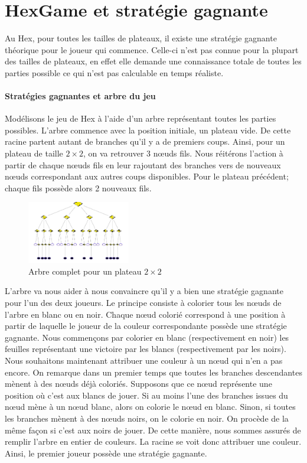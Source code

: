 \section{HexGame et stratégie gagnante}

Au Hex, pour toutes les tailles de plateaux, il existe une stratégie gagnante théorique pour le joueur qui commence.
Celle-ci n'est pas connue pour la plupart des tailles de plateaux, en effet elle demande une connaissance totale de toutes  
les parties possible ce qui n'est pas calculable en temps réaliste.

\paragraph{Stratégies gagnantes et arbre du jeu}
Modélisons le jeu de Hex à l'aide d'un arbre représentant toutes les parties possibles. L'arbre commence avec la position 
initiale, un plateau vide. De cette racine partent autant de branches qu'il y a de premiers coups. Ainsi, pour un plateau de
taille $2\times2$, on va retrouver 3 nœuds fils. Nous réitérons l'action à partir de chaque nœuds fils en leur rajoutant des branches vers
de nouveaux nœuds correspondant aux autres coups disponibles. Pour le plateau précédent; chaque fils possède alors 2 nouveaux fils.
\begin{figure}[h]
    \begin{center}
        \includegraphics[width=0.4\textwidth]{root/strategie_gagnante.png}
    \end{center}
    \caption{Arbre complet pour un plateau $2\times2$}\label{fig:strategie_gagnante}
\end{figure}


L'arbre va nous aider à nous convaincre qu'il y a bien une stratégie gagnante pour l'un des deux joueurs. 
Le principe consiste à colorier tous les nœuds de l'arbre en blanc ou en noir. Chaque
nœud colorié correspond à une position à partir de laquelle le joueur de la couleur correspondante
possède une stratégie gagnante. 
Nous commençons par colorier en blanc (respectivement en noir) les feuilles représentant une victoire par les blancs
(respectivement par les noirs).
Nous souhaitons maintenant attribuer une couleur à un nœud qui n'en a pas encore. On remarque dans un premier temps que toutes les 
branches descendantes mènent à des nœuds déjà coloriés. Supposons que ce nœud représente une position où c'est 
aux blancs de jouer. Si au moins l'une des branches issues du nœud mène à un nœud blanc, alors on colorie le nœud
en blanc. Sinon, si toutes les branches mènent à des nœuds noirs, on le colorie en noir. On procède de la même façon si c'est 
aux noirs de jouer. De cette manière, nous sommes assurés de remplir l'arbre en entier de couleurs. La racine se voit donc attribuer 
une couleur. Ainsi, le premier joueur possède une stratégie gagnante.


